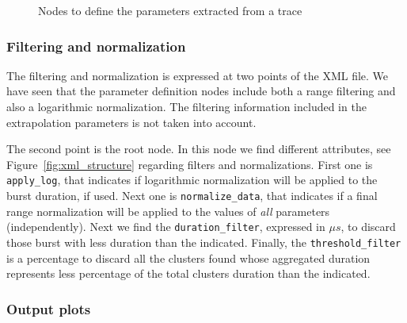 \documentclass[twoside,a4,english,11pt]{book}
\begin{document}
\begin{figure}
  \centering
  
  
  
  \caption{Nodes to define the parameters extracted from a trace}
  \label{fig:xml_events_definition}

\end{figure}

\subsubsection{Filtering and normalization}

The filtering and normalization is expressed at two points of the XML file.
We have seen that the parameter definition nodes include both a range 
filtering and also a logarithmic normalization. The filtering information
included in the extrapolation parameters is not taken into account.

The second point is the root node. In this node we find different attributes,
see Figure~\ref{fig:xml_structure} regarding filters and normalizations.
First one is \texttt{apply\_log}, that indicates if logarithmic normalization
will be applied to the burst duration, if used. Next one is \texttt{normalize\_data},
that indicates if a final range normalization will be applied to the values 
of \textit{all} parameters (independently). Next we find the
\texttt{duration\_filter}, expressed in $\mu s$, to discard those burst with
less duration than the indicated. Finally, the \texttt{threshold\_filter}
is a percentage to discard all the clusters found whose aggregated duration 
represents less percentage of the total clusters duration than the indicated.

\subsubsection{Output plots}
\end{document}
